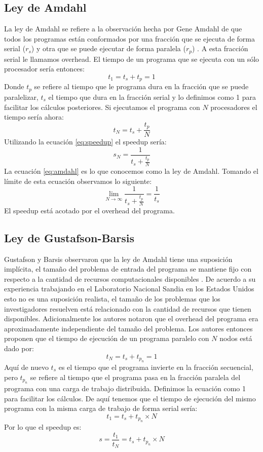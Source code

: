 \subsection{Ley de Amdahl}
La ley de Amdahl se refiere a la observación hecha por Gene Amdahl de que todos los programas están conformados por una fracción que se ejecuta de forma serial ($r_s$) y otra que se puede ejecutar de forma paralela ($r_p$) \cite{amdahl1967}. A esta fracción serial le llamamos overhead. El tiempo de un programa que se ejecuta con un sólo procesador sería entonces:
$$t_1 = t_s + t_p = 1$$
Donde $t_p$ se refiere al tiempo que le programa dura en la fracción que se puede paralelizar, $t_s$ el tiempo que dura en la fracción serial y lo definimos como 1 para facilitar los cálculos posteriores.
Si ejecutamos el programa con $N$ procesadores el tiempo sería ahora:
$$t_N = t_s + \frac{t_p}{N}$$
Utilizando la ecuación \ref{eq:speedup} el speedup sería:
\begin{equation}
  s_N = \frac{1}{t_s + \frac{t_p}{N}}
  \label{eq:amdahl}
\end{equation}
La ecuación \ref{eq:amdahl} es lo que conocemos como la ley de Amdahl. Tomando el límite de esta ecuación observamos lo siguiente:
$$\lim_{N\to\infty} \frac{1}{t_s + \frac{t_p}{N}} = \frac{1}{t_s}$$
El speedup está acotado por el overhead del programa.
\subsection{Ley de Gustafson-Barsis}
Gustafson y Barsis observaron que la ley de Amdahl tiene una suposición implícita, el tamaño del problema de entrada del programa se mantiene fijo con respecto a la cantidad de recursos computacionales disponibles \cite{Gustafson1988}. De acuerdo a su experiencia trabajando en el Laboratorio Nacional Sandia en los Estados Unidos esto no es una suposición realista, el tamaño de los problemas que los investigadores resuelven está relacionado con la cantidad de recursos que tienen disponibles. Adicionalmente los autores notaron que el overhead del programa era aproximadamente independiente del tamaño del problema. Los autores entonces proponen que el tiempo de ejecución de un programa paralelo con $N$ nodos está dado por:
$$t_N = t_s + t_{p_n} = 1$$
Aquí de nuevo $t_s$ es el tiempo que el programa invierte en la fracción secuencial, pero $t_{p_n}$ se refiere al tiempo que el programa pasa en la fracción paralela del programa con una carga de trabajo distribuida. Definimos la ecuación como 1 para facilitar los cálculos.
De aquí tenemos que el tiempo de ejecución del mismo programa con la misma carga de trabajo de forma serial sería:
$$t_1 = t_s + t_{p_n}\times N$$
Por lo que el speedup es:
\begin{equation}
  s = \frac{t_1}{t_N} = t_s + t_{p_n}\times N
  \label{eq:gustafson}
\end{equation}

